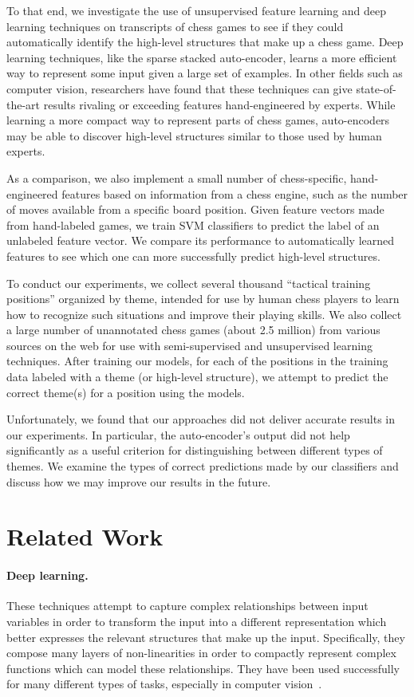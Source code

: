 \documentclass[11pt]{article}
\begin{document}
To that end, we investigate the use of unsupervised feature learning and 
deep learning techniques on transcripts of chess games to see if they 
could automatically identify the high-level structures that make up a 
chess game. Deep learning techniques, like the sparse stacked 
auto-encoder, learns a more efficient way to represent some input given 
a large set of examples. In other fields such as computer vision, 
researchers have found that these techniques can give state-of-the-art 
results rivaling or exceeding features hand-engineered by experts. While 
learning a more compact way to represent parts of chess games, 
auto-encoders may be able to discover high-level structures similar to 
those used by human experts.

As a comparison, we also implement a small number of chess-specific, 
hand-engineered features based on information from a chess engine, such 
as the number of moves available from a specific board position. Given 
feature vectors made from hand-labeled games, we train SVM classifiers 
to predict the label of an unlabeled feature vector. We compare its 
performance to automatically learned features to see which one can more 
successfully predict high-level structures.

To conduct our experiments, we collect several thousand ``tactical 
training positions'' organized by theme, intended for use by human chess 
players to learn how to recognize such situations and improve their 
playing skills. We also collect a large number of unannotated chess 
games (about 2.5 million) from various sources on the web for use with 
semi-supervised and unsupervised learning techniques. After training our 
models, for each of the positions in the training data labeled with a 
theme (or high-level structure), we attempt to predict the correct 
theme(s) for a position using the models.

Unfortunately, we found that our approaches did not deliver accurate 
results in our experiments. In particular, the auto-encoder's output did 
not help significantly as a useful criterion for distinguishing between 
different types of themes. We examine the types of correct predictions 
made by our classifiers and discuss how we may improve our results in 
the future.

\section{Related Work}

\paragraph{Deep learning.} These techniques attempt to capture complex 
relationships between input variables in order to transform the input 
into a different representation which better expresses the relevant 
structures that make up the input. Specifically, they compose many 
layers of non-linearities in order to compactly represent complex 
functions which can model these relationships. They have been used 
successfully for many different types of tasks, especially in computer 
vision~\cite{Vincent,Lee,Socher}.
\end{document}
